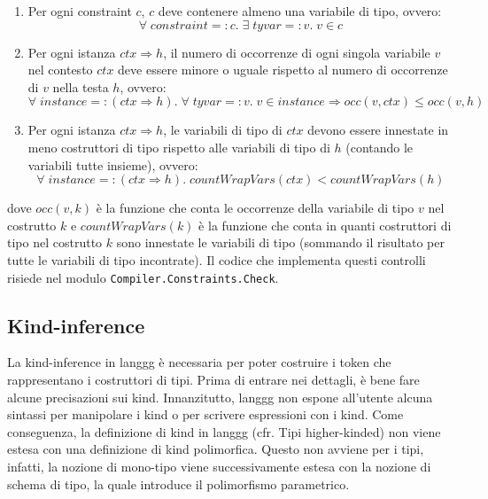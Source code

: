 \documentclass[10pt,a4paper]{article}
\begin{document}
\begin{enumerate}
    \item Per ogni constraint $ c $, $ c $ deve contenere almeno una variabile di tipo, ovvero:
    \[ \forall \; constraint =: c.\; \exists \; tyvar =: v.\; v \in c \]
    \item Per ogni istanza $ ctx \Rightarrow h $, il numero di occorrenze di ogni singola variabile $ v $ nel contesto
    $ ctx $ deve essere minore o uguale rispetto al numero di occorrenze di $ v $ nella testa $ h $, ovvero:
    \[ \forall \; instance =: (ctx \Rightarrow h).\; \forall \; tyvar =: v.\; v \in instance
    \Longrightarrow occ(v, ctx) \leq occ(v, h) \]
    \item Per ogni istanza $ ctx \Rightarrow h $, le variabili di tipo di $ ctx $ devono essere innestate in meno
    costruttori di tipo rispetto alle variabili di tipo di $ h $ (contando le variabili tutte insieme), ovvero: \newline
    \[ \forall \; instance =: (ctx \Rightarrow h).\; countWrapVars(ctx) < countWrapVars(h) \]
\end{enumerate}
dove $ occ(v, k) $ è la funzione che conta le occorrenze della variabile di tipo $ v $ nel costrutto $ k $ e
$ countWrapVars(k) $ è la funzione che conta in quanti costruttori di tipo nel costrutto $ k $ sono innestate le
variabili di tipo (sommando il risultato per tutte le variabili di tipo incontrate). Il codice che implementa questi
controlli risiede nel modulo \texttt{Compiler.Constraints.Check}.

\subsection{Kind-inference}
La kind-inference in langgg è necessaria per poter costruire i token che rappresentano i costruttori di tipi. Prima
di entrare nei dettagli, è bene fare alcune precisazioni sui kind. Innanzitutto, langgg non espone all'utente alcuna
sintassi per manipolare i kind o per scrivere espressioni con i kind. Come conseguenza, la definizione di kind in
langgg (cfr. Tipi higher-kinded) non viene estesa con una definizione di kind polimorfica. Questo non avviene per i tipi,
infatti, la nozione di mono-tipo viene successivamente estesa con la nozione di schema di tipo, la quale introduce
il polimorfismo parametrico.
\end{document}
